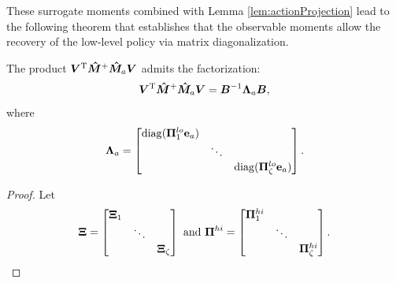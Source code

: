 These surrogate moments combined with Lemma \ref{lem:actionProjection} lead to the following theorem that establishes that the observable moments allow the recovery of the low-level policy via matrix diagonalization.
\begin{theorem}\label{theo:central}
The product $\bm{V}^{\mathrm{T}}\bm{\hat{M}}^+\bm{\hat{M}}_a\bm{V}$ admits the factorization:
\[\label{eq:diagonalize}
    \bm{V}^{\mathrm{T}}\bm{\hat{M}}^+\bm{\hat{M}}_a\bm{V} = \bm{B}^{-1}\bm{\Lambda}_a\bm{B},
\]
where
\[\label{eq:Lambda_definition}
    \bm{\Lambda}_a = \bmat{\mathrm{diag}(\bm{\Pi}^{lo}_1\unit_a)&&\\
              &\ddots&\\
              &&\mathrm{diag}(\bm{\Pi}^{lo}_{\zeta}\unit_a)}.
\]
\end{theorem}
\begin{proof}
Let 
\[
    \bm{\Xi}=\bmat{\bm{\Xi}_1&&\\&\ddots&\\&&\bm{\Xi}_\zeta}
    \text{ and } \bm{\Pi}^{hi}=\bmat{\bm{\Pi}^{hi}_1&&\\&\ddots&\\&&\bm{\Pi}^{hi}_\zeta}.
\]


\end{proof}
